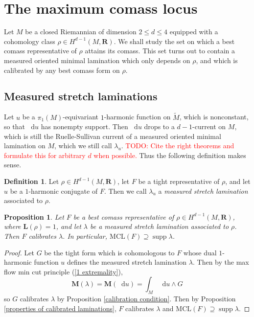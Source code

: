 \documentclass[reqno,11pt]{amsart}
\newcommand{\RR}{\mathbf{R}}
\newcommand*\dif{\mathop{}\!\mathrm{d}}
\DeclareMathOperator{\supp}{supp}
\newcommand{\MCL}{\mathrm{MCL}}
\newcommand{\Mass}{\mathbf M}
\newcommand{\Comass}{\mathbf L}
\newcommand{\dfn}[1]{\emph{#1}\index{#1}}
\newtheorem{proposition}[theorem]{Proposition}
\theoremstyle{definition}
\newtheorem{definition}[theorem]{Definition}
\numberwithin{equation}{section}
\newcommand\todo[1]{\textcolor{red}{TODO: #1}}
\begin{document}


\section{The maximum comass locus}\label{MCL sec}
Let $M$ be a closed Riemannian of dimension $2 \leq d \leq 4$ equipped with a cohomology class $\rho \in H^{d - 1}(M, \RR)$.
We shall study the set on which a best comass representative of $\rho$ attains its comass.
This set turns out to contain a measured oriented minimal lamination which only depends on $\rho$, and which is calibrated by any best comass form on $\rho$.

\subsection{Measured stretch laminations}
Let $u$ be a $\pi_1(M)$-equivariant $1$-harmonic function on $\tilde M$, which is nonconstant, so that $\dif u$ has nonempty support.
Then $\dif u$ drops to a $d-1$-current on $M$, which is still the Ruelle-Sullivan current of a measured oriented minimal lamination on $M$, which we still call $\lambda_u$.
\todo{Cite the right theorems and formulate this for arbitrary $d$ when possible.}
Thus the following definition makes sense.

\begin{definition}
Let $\rho \in H^{d - 1}(M, \RR)$, let $F$ be a tight representative of $\rho$, and let $u$ be a $1$-harmonic conjugate of $F$.
Then we call $\lambda_u$ a \dfn{measured stretch lamination} associated to $\rho$.
\end{definition}

\begin{proposition}\label{MCL contains Thurston}
Let $F$ be a best comass representative of $\rho \in H^{d - 1}(M, \RR)$, where $\Comass(\rho) = 1$, and let $\lambda$ be a measured stretch lamination associated to $\rho$.
Then $F$ calibrates $\lambda$. In particular, $\MCL(F) \supseteq \supp \lambda$.
\end{proposition}
\begin{proof}
Let $G$ be the tight form which is cohomologous to $F$ whose dual $1$-harmonic function $u$ defines the measured stretch lamination $\lambda$.
Then by the max flow min cut principle (\ref{1 extremality}), 
$$\Mass(\lambda) = \Mass(\dif u) = \int_M \dif u \wedge G$$
so $G$ calibrates $\lambda$ by Proposition \ref{calibration condition}.
Then by Proposition \ref{properties of calibrated laminations}, $F$ calibrates $\lambda$ and $\MCL(F) \supseteq \supp \lambda$.
\end{proof}
\end{document}

